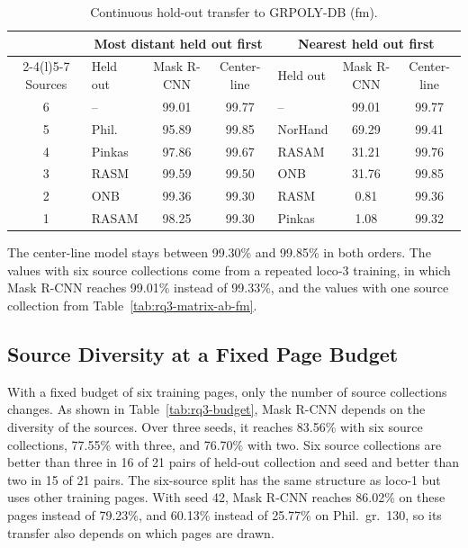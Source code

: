 \begin{table}[htbp]
    \centering
    \caption{Continuous hold-out transfer to GRPOLY-DB (\gls{fm}).}
    \label{tab:rq3-stepdown}
    \footnotesize
    \setlength{\tabcolsep}{4pt}
    \begin{tabular}{@{}c lcc lcc@{}}
        \toprule
        & \multicolumn{3}{c}{Most distant held out first} & \multicolumn{3}{c}{Nearest held out first} \\
        \cmidrule(lr){2-4}\cmidrule(l){5-7}
        Sources & Held out & Mask R-CNN & Center-line & Held out & Mask R-CNN & Center-line \\
        \midrule
        6 & -- & 99.01 & 99.77 & -- & 99.01 & 99.77 \\
        5 & Phil. & 95.89 & 99.85 & NorHand & 69.29 & 99.41 \\
        4 & Pinkas & 97.86 & 99.67 & RASAM & 31.21 & 99.76 \\
        3 & RASM & 99.59 & 99.50 & ONB & 31.76 & 99.85 \\
        2 & ONB & 99.36 & 99.30 & RASM & 0.81 & 99.36 \\
        1 & RASAM & 98.25 & 99.30 & Pinkas & 1.08 & 99.32 \\
        \bottomrule
    \end{tabular}
\end{table}

The center-line model stays between 99.30\% and 99.85\% in both orders. The values with six source collections come from a repeated \gls{loco}-3 training, in which Mask R-CNN reaches 99.01\% instead of 99.33\%, and the values with one source collection from Table~\ref{tab:rq3-matrix-ab-fm}.

\FloatBarrier
\subsection{Source Diversity at a Fixed Page Budget}
\label{sec:results-rq3-budget}


With a fixed budget of six training pages, only the number of source collections changes. As shown in Table~\ref{tab:rq3-budget}, Mask R-CNN depends on the diversity of the sources. Over three seeds, it reaches 83.56\% with six source collections, 77.55\% with three, and 76.70\% with two. Six source collections are better than three in 16 of 21 pairs of held-out collection and seed and better than two in 15 of 21 pairs. The six-source split has the same structure as \gls{loco}-1 but uses other training pages. With seed 42, Mask R-CNN reaches 86.02\% on these pages instead of 79.23\%, and 60.13\% instead of 25.77\% on Phil.\ gr.\ 130, so its transfer also depends on which pages are drawn.

